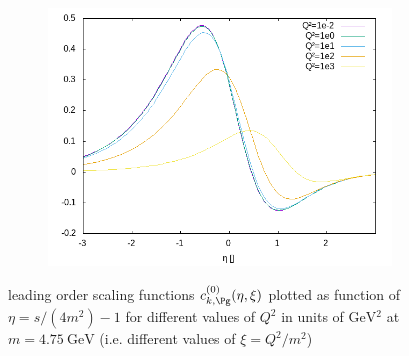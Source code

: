 \begin{figure}[ht!]
\begin{subfigure}[t]{.3\textwidth}
\end{subfigure}%
\begin{subfigure}[t]{.3\textwidth}
	\includegraphics[width=\textwidth]{../../img2/partonic/cg0_AA_x2g1}
\end{subfigure}%
\caption{leading order scaling functions $c_{k,\Pg}^{(0)}(\eta,\xi)$ plotted as function of $\eta=s/(4m^2)-1$ for different values of $Q^2$ in units of $\si{\GeV^2}$ at $m=\SI{4.75}{\GeV}$ (i.e. different values of $\xi=Q^2/m^2$) }\label{fig:cg0}
\end{figure}
